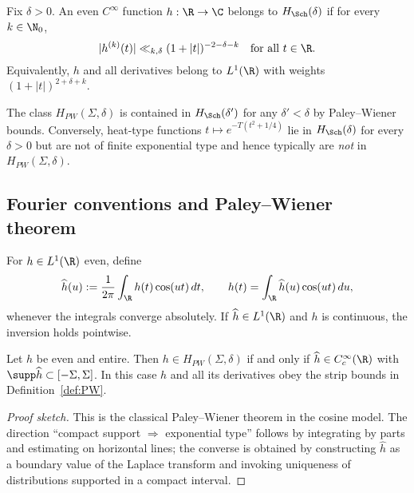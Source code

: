 \begin{definition}
\label{def:Sch}
Fix $\delta>0$. An even $C^\infty$ function $h:\R\to\C$ belongs to $H_{\Sch}(\delta)$ if for every $k\in\N_0$,
\[
  |h^{(k)}(t)| \ll_{k,\delta} (1+|t|)^{-2-\delta-k}\quad \text{for all } t\in\R.
\]
Equivalently, $h$ and all derivatives belong to $L^1(\R)$ with weights $(1+|t|)^{2+\delta+k}$.
\end{definition}

\begin{remark}
\label{rem:classes-complement}
The class $H_{PW}(\Sigma,\delta)$ is contained in $H_{\Sch}(\delta')$ for any $\delta'<\delta$ by Paley–Wiener bounds. Conversely, heat-type functions $t\mapsto e^{-T(t^2+1/4)}$ lie in $H_{\Sch}(\delta)$ for every $\delta>0$ but are not of finite exponential type and hence typically are \emph{not} in $H_{PW}(\Sigma,\delta)$.
\end{remark}

\subsection{Fourier conventions and Paley–Wiener theorem}
\label{subsec:fourier-conventions}

\begin{definition}
\label{def:cosine-transform}
For $h\in L^1(\R)$ even, define
\[
  \widehat h(u) := \frac{1}{2\pi}\int_{\R} h(t)\cos(ut)\,dt,\qquad
  h(t) = \int_{\R} \widehat h(u)\cos(ut)\,du,
\]
whenever the integrals converge absolutely. If $\widehat h\in L^1(\R)$ and $h$ is continuous, the inversion holds pointwise.
\end{definition}

\begin{theorem}
\label{thm:PW}
Let $h$ be even and entire. Then $h\in H_{PW}(\Sigma,\delta)$ if and only if $\widehat h\in C_c^\infty(\R)$ with $\supp\widehat h\subset[-\Sigma,\Sigma]$. In this case $h$ and all its derivatives obey the strip bounds in Definition~\ref{def:PW}.
\end{theorem}

\begin{proof}[Proof sketch]
This is the classical Paley–Wiener theorem in the cosine model. The direction ``compact support $\Rightarrow$ exponential type'' follows by integrating by parts and estimating on horizontal lines; the converse is obtained by constructing $\widehat h$ as a boundary value of the Laplace transform and invoking uniqueness of distributions supported in a compact interval.
\end{proof}


